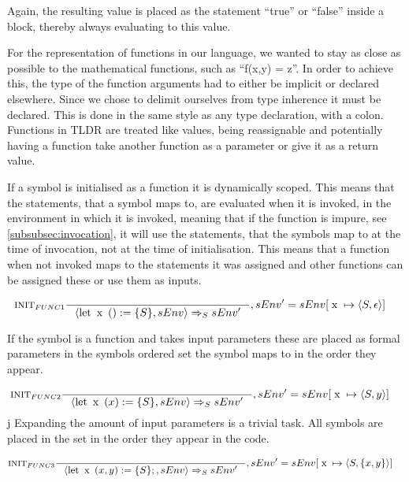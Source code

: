 Again, the resulting value is placed as the statement \enquote{true} or \enquote{false} inside a block, thereby always evaluating to this value.

For the representation of functions in our language, we wanted to stay as close as possible to the mathematical functions, such as \enquote{f(x,y) = z}. In order to achieve this, the type of the function arguments had to either be implicit or declared elsewhere. Since we chose to delimit ourselves from type inherence it must be declared. This is done in the same style as any type declaration, with a colon. Functions in TLDR are treated like values, being reassignable and potentially having a function take another function as a parameter or give it as a return value.

If a symbol is initialised as a function it is dynamically scoped. This means that the statements, that a symbol maps to, are evaluated when it is invoked, in the environment in which it is invoked, meaning that if the function is impure, see \cref{subsubsec:invocation}, it will use the statements, that the symbols map to at the time of invocation, not at the time of initialisation. This means that a function when not invoked maps to the statements it was assigned and other functions can be assigned these or use them as inputs.

\begin{align*}
&\inference[$\text{INIT}_{FUNC1}$]{}
                         {\Braket{\Tlet \Tx() := \{S\},sEnv} \Rightarrow_S sEnv'}
												 {, sEnv' = sEnv[\Tx \mapsto \Braket{S,\epsilon}]}
\end{align*}

If the symbol is a function and takes input parameters these are placed as formal parameters in the symbols ordered set the symbol maps to in the order they appear.

\begin{align*}
&\inference[$\text{INIT}_{FUNC2}$]{}
                         {\Braket{\Tlet \Tx(x) := \{S\},sEnv} \Rightarrow_S sEnv'}
												 {, sEnv' = sEnv[\Tx \mapsto \Braket{S,y}]}
\end{align*}
j
Expanding the amount of input parameters is a trivial task. All symbols are placed in the set in the order they appear in the code. 

\begin{align*}
&\inference[$\text{INIT}_{FUNC3}$]{}
                         {\Braket{\Tlet \Tx(x,y) := \{S\};,sEnv} \Rightarrow_S sEnv'}
												 {, sEnv' = sEnv[\Tx \mapsto \Braket{S,\{x,y\}}]}
\end{align*}

